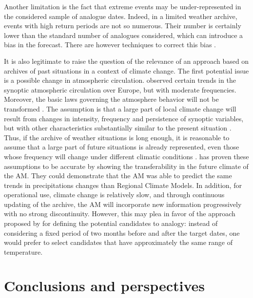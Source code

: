 \documentclass[review]{elsarticle}
\begin{document}
Another limitation is the fact that extreme events may be under-represented in the considered sample of analogue dates. Indeed, in a limited weather archive, events with high return periods are not so numerous. Their number is certainly lower than the standard number of analogues considered, which can introduce a bias in the forecast. There are however techniques to correct this bias \citep[see][]{Marty2010}.

It is also legitimate to raise the question of the relevance of an approach based on archives of past situations in a context of climate change. The first potential issue is a possible change in atmospheric circulation. \citet{Philipp2007} observed certain trends in the synoptic atmospheric circulation over Europe, but with moderate frequencies. Moreover, the basic laws governing the atmosphere behavior will not be transformed \citep{Hewitson1996}. The assumption is that a large part of local climate change will result from changes in intensity, frequency and persistence of synoptic variables, but with other characteristics substantially similar to the present situation \citep{Hewitson1996}. Thus, if the archive of weather situations is long enough, it is reasonable to assume that a large part of future situations is already represented, even those whose frequency will change under different climatic conditions \citep{Wetterhall2005}. \citet{Dayon2015} has proven these assumptions to be accurate by showing the transferability in the future climate of the AM. They could demonstrate that the AM was able to predict the same trends in precipitations changes than Regional Climate Models. In addition, for operational use, climate change is relatively slow, and through continuous updating of the archive, the AM will incorporate new information progressively with no strong discontinuity. However, this may plea in favor of the approach proposed by \cite{BenDaoud2010} for defining the potential candidates to analogy: instead of considering a fixed period of two months before and after the target dates, one would prefer to select candidates that have approximately the same range of temperature.


\section{Conclusions and perspectives}
\label{sec:conclusions}
\end{document}
